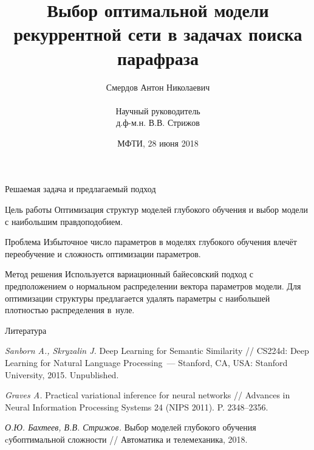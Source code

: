 \documentclass{beamer}
\title[\hbox to 56mm{Выбор оптимальной модели рекуррентной сети\ \  \hfill\insertframenumber\,/\,\inserttotalframenumber}]
{Выбор оптимальной модели рекуррентной сети в задачах поиска парафраза}
\author[А.\,Н. Смердов]{{\large Смердов Антон Николаевич\\~} {\small \\ Научный руководитель \\ д.ф-м.н. В.В. Стрижов}}
\institute[МФТИ]{Московский физико-технический институт \\
	Факультет управления и прикладной математики\\
	Кафедра <<Интеллектуальные системы>>
}
\date{\footnotesize{МФТИ, 28 июня 2018}}
\begin{document}
\begin{frame}
	\titlepage
\end{frame}

\begin{frame}{Решаемая задача и предлагаемый подход}

\begin{block}{Цель работы}
Оптимизация структур моделей глубокого обучения и выбор модели с наибольшим правдоподобием.

\end{block}

\begin{block}{Проблема}
Избыточное число параметров в моделях глубокого обучения влечёт переобучение и сложность оптимизации параметров.
\end{block}

\begin{block}{Метод решения}
Используется вариационный байесовский подход с предположением о нормальном распределении вектора параметров модели. Для оптимизации структуры предлагается удалять параметры с наибольшей плотностью распределения в~нуле.


\end{block}

\end{frame}
\begin{frame}{Литература}
%	
	
\begin{thebibliography}{}
	\textit{Sanborn A., Skryzalin J.} 
	Deep Learning for Semantic Similarity // CS224d: Deep Learning for Natural Language Processing~--- Stanford, CA, USA: Stanford University, 2015. Unpublished.
	
	\textit{Graves A.}
	Practical variational inference for neural networks // Advances in Neural Information Processing Systems 24 (NIPS 2011). P. 2348--2356.
	
	\textit{О.Ю. Бахтеев, В.В. Стрижов.}
	Выбор моделей глубокого обучения cубоптимальной сложности // Автоматика и телемеханика, 2018.
\end{thebibliography}{}
	
\end{frame}
\end{document}
